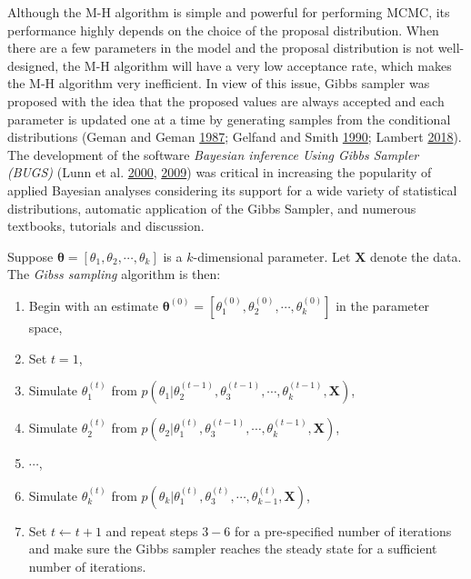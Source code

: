 \documentclass[12pt]{book}
\numberwithin{equation}{chapter}
\providecommand{\tightlist}{%
  \setlength{\itemsep}{0pt}\setlength{\parskip}{0pt}}
\begin{document}
Although the M-H algorithm is simple and powerful for performing MCMC, its performance highly depends on the choice of the proposal distribution. When there are a few parameters in the model and the proposal distribution is not well-designed, the M-H algorithm will have a very low acceptance rate, which makes the M-H algorithm very inefficient. In view of this issue, Gibbs sampler was proposed with the idea that the proposed values are always accepted and each parameter is updated one at a time by generating samples from the conditional distributions (Geman and Geman \protect\hyperlink{ref-geman1987stochastic}{1987}; Gelfand and Smith \protect\hyperlink{ref-gelfand1990sampling}{1990}; Lambert \protect\hyperlink{ref-lambert2018student}{2018}). The development of the software \emph{Bayesian inference Using Gibbs Sampler (BUGS)} (Lunn et al. \protect\hyperlink{ref-lunn2000winbugs}{2000}, \protect\hyperlink{ref-lunn2009bugs}{2009}) was critical in increasing the popularity of applied Bayesian analyses considering its support for a wide variety of statistical distributions, automatic application of the Gibbs Sampler, and numerous textbooks, tutorials and discussion.

Suppose \(\mathbf{\theta} = [\theta_1, \theta_2, \cdots, \theta_k]\) is a \(k\)-dimensional parameter. Let \(\mathbf{X}\) denote the data. The \emph{Gibss sampling} algorithm is then:

\begin{enumerate}
\def\labelenumi{\arabic{enumi}.}
\tightlist
\item
  Begin with an estimate \(\mathbf{\theta}^{(0)} = [\theta_1^{(0)}, \theta_2^{(0)}, \cdots , \theta_k^{(0)}]\) in the parameter space,
\item
  Set \(t = 1\),
\item
  Simulate \(\theta_1^{(t)}\) from \(p(\theta_1|\theta_2^{(t-1)}, \theta_3^{(t-1)},\cdots , \theta_k^{(t-1)}, \mathbf{X})\),
\item
  Simulate \(\theta_2^{(t)}\) from \(p(\theta_2|\theta_1^{(t)}, \theta_3^{(t-1)},\cdots , \theta_k^{(t-1)}, \mathbf{X})\),
\item
  \(\cdots\),
\item
  Simulate \(\theta_k^{(t)}\) from \(p(\theta_k|\theta_1^{(t)}, \theta_3^{(t)},\cdots , \theta_{k-1}^{(t)}, \mathbf{X})\),
\item
  Set \(t \leftarrow t + 1\) and repeat steps \(3-6\) for a pre-specified number of iterations and make sure the Gibbs sampler reaches the steady state for a sufficient number of iterations.
\end{enumerate}
\end{document}
